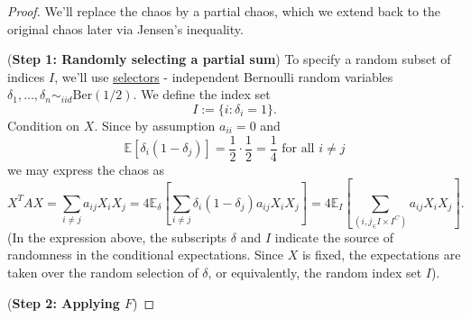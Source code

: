 \begin{proof}
We'll replace the chaos by a partial chaos, which we extend back to the original chaos later via Jensen's 
inequality.

(\textbf{Step 1: Randomly selecting a partial sum}) To specify a random subset of indices $I$, we'll use 
\underline{selectors} - independent Bernoulli random variables $\delta_1, \dots, \delta_n \sim_{iid} 
\mathrm{Ber}(1/2)$. We define the index set 
\[ I := \{ i: \delta_i = 1 \}. \]
Condition on $X$. Since by assumption $a_{ii} = 0$ and 
\[ \mathbb{E}[\delta_i(1 - \delta_j)] = \frac{1}{2} \cdot \frac{1}{2} = \frac{1}{4} \text{ for all } i \neq j \]
we may express the chaos as 
\[ X^T AX = \sum_{i \neq j}^{} a_{ij} X_iX_j 
= 4 \mathbb{E}_{\delta}\left[ \sum_{i \neq j}^{} \delta_i(1 - \delta_j) a_{ij} X_iX_j \right] 
= 4 \mathbb{E}_I \left[ \sum_{(i, j_ \in I \times I^C)}^{} a_{ij}X_iX_j \right]. \]
(In the expression above, the subscripts $\delta$ and $I$ indicate the source of randomness in the conditional 
expectations. Since $X$ is fixed, the expectations are taken over the random selection of $\delta$, or 
equivalently, the random index set $I$).

(\textbf{Step 2: Applying $F$}) 
\end{proof}

